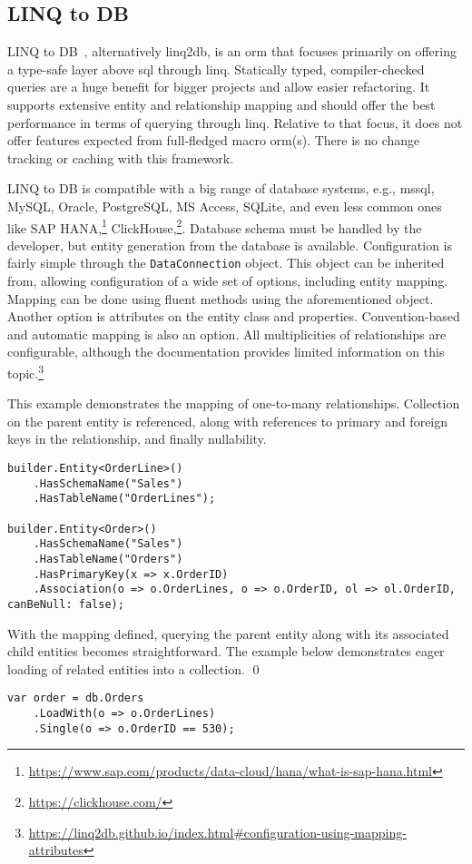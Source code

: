 \subsection{LINQ to DB}
\label{section:linqToDb}

LINQ to DB~\cite{linq2db, linq2dbRepo}, alternatively linq2db, is an \acrshort{orm} that focuses primarily on offering a type-safe layer above \acrshort{sql} through \acrshort{linq}. Statically typed, compiler-checked queries are a huge benefit for bigger projects and allow easier refactoring. It supports extensive entity and relationship mapping and should offer the best performance in terms of querying through \acrshort{linq}. Relative to that focus, it does not offer features expected from full-fledged macro \acrshort{orm}(s). There is no change tracking or caching with this framework.

LINQ to DB is compatible with a big range of database systems, e.g., \acrshort{mssql}, MySQL, Oracle, PostgreSQL, MS Access, SQLite, and even less common ones like SAP HANA,\footnote{\url{https://www.sap.com/products/data-cloud/hana/what-is-sap-hana.html}} ClickHouse,\footnote{\url{https://clickhouse.com/}}. Database schema must be handled by the developer, but entity generation from the database is available. Configuration is fairly simple through the \texttt{DataConnection} object. This object can be inherited from, allowing configuration of a wide set of options, including entity mapping. Mapping can be done using fluent methods using the aforementioned object. Another option is attributes on the entity class and properties. Convention-based and automatic mapping is also an option. All multiplicities of relationships are configurable, although the documentation provides limited information on this topic.\footnote{\url{https://linq2db.github.io/index.html\#configuration-using-mapping-attributes}}

\begin{example}
\small
This example demonstrates the mapping of one-to-many relationships. Collection on the parent entity is referenced, along with references to primary and foreign keys in the relationship, and finally nullability.

\begin{lstlisting}[language=CSharp]
builder.Entity<OrderLine>()
    .HasSchemaName("Sales")
    .HasTableName("OrderLines");

builder.Entity<Order>()
    .HasSchemaName("Sales")
    .HasTableName("Orders")
    .HasPrimaryKey(x => x.OrderID)
    .Association(o => o.OrderLines, o => o.OrderID, ol => ol.OrderID, canBeNull: false);
\end{lstlisting}

\small With the mapping defined, querying the parent entity along with its associated child entities becomes straightforward. The example below demonstrates eager loading of related entities into a collection.
\qed

\begin{lstlisting}[language=CSharp]
var order = db.Orders
    .LoadWith(o => o.OrderLines)
    .Single(o => o.OrderID == 530);
\end{lstlisting}
\end{example}

